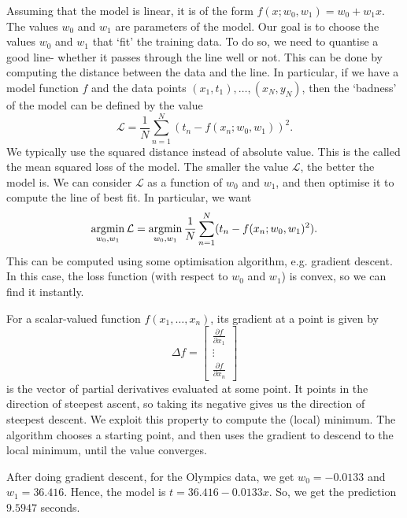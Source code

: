 \documentclass[a4paper, openany]{memoir}
\newcommand{\argmin}{\operatornamewithlimits{argmin}}
\begin{document}
    Assuming that the model is linear, it is of the form $f(x; w_0, w_1) = w_0 + w_1x$. The values $w_0$ and $w_1$ are parameters of the model. Our goal is to choose the values $w_0$ and $w_1$ that `fit' the training data. To do so, we need to quantise a good line- whether it passes through the line well or not. This can be done by computing the distance between the data and the line. In particular, if we have a model function $f$ and the data points $(x_1, t_1), \dots, (x_N, y_N)$, then the `badness' of the model can be defined by the value
    \[\mathcal{L} = \frac{1}{N} \sum_{n=1}^N (t_n - f(x_n; w_0, w_1))^2.\]
    We typically use the squared distance instead of absolute value. This is the called the mean squared loss of the model. The smaller the value $\mathcal{L}$, the better the model is. We can consider $\mathcal{L}$ as a function of $w_0$ and $w_1$, and then optimise it to compute the line of best fit. In particular, we want
    \[\argmin_{w_0, w_1} \mathcal{L} = \argmin_{w_0, w_1} \frac{1}{N} \sum_{n=1}^N (t_n - f(x_n; w_0, w_1)^2).\]
    This can be computed using some optimisation algorithm, e.g. gradient descent. In this case, the loss function (with respect to $w_0$ and $w_1$) is convex, so we can find it instantly.

    For a scalar-valued function $f(x_1, \dots, x_n)$, its gradient at a point is given by
    \[\Delta f = \begin{bmatrix}
        \frac{\partial f}{\partial x_1} \\
        \vdots \\
        \frac{\partial f}{\partial x_n}
    \end{bmatrix}\]
    is the vector of partial derivatives evaluated at some point. It points in the direction of steepest ascent, so taking its negative gives us the direction of steepest descent. We exploit this property to compute the (local) minimum. The algorithm chooses a starting point, and then uses the gradient to descend to the local minimum, until the value converges.

    After doing gradient descent, for the Olympics data, we get $w_0 = -0.0133$ and $w_1 = 36.416$. Hence, the model is $t = 36.416 - 0.0133x$. So, we get the prediction $9.5947$ seconds.
\end{document}
